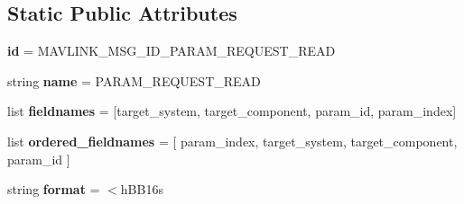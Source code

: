 \subsection*{Static Public Attributes}
\begin{DoxyCompactItemize}
\item 
\mbox{\label{classpymavlink_1_1dialects_1_1v10_1_1MAVLink__param__request__read__message_ae8f68d84282279665614cb2ad2c1c4a7}} 
{\bfseries id} = M\+A\+V\+L\+I\+N\+K\+\_\+\+M\+S\+G\+\_\+\+I\+D\+\_\+\+P\+A\+R\+A\+M\+\_\+\+R\+E\+Q\+U\+E\+S\+T\+\_\+\+R\+E\+AD
\item 
\mbox{\label{classpymavlink_1_1dialects_1_1v10_1_1MAVLink__param__request__read__message_a6ccaea0f955d96faa16d4aefde331ead}} 
string {\bfseries name} = \textquotesingle{}P\+A\+R\+A\+M\+\_\+\+R\+E\+Q\+U\+E\+S\+T\+\_\+\+R\+E\+AD\textquotesingle{}
\item 
\mbox{\label{classpymavlink_1_1dialects_1_1v10_1_1MAVLink__param__request__read__message_a5c7ed1929c10e42a3be3fe96141f7147}} 
list {\bfseries fieldnames} = \mbox{[}\textquotesingle{}target\+\_\+system\textquotesingle{}, \textquotesingle{}target\+\_\+component\textquotesingle{}, \textquotesingle{}param\+\_\+id\textquotesingle{}, \textquotesingle{}param\+\_\+index\textquotesingle{}\mbox{]}
\item 
\mbox{\label{classpymavlink_1_1dialects_1_1v10_1_1MAVLink__param__request__read__message_ab82aca844a02b6db0b9f6b3749ccbbf8}} 
list {\bfseries ordered\+\_\+fieldnames} = \mbox{[} \textquotesingle{}param\+\_\+index\textquotesingle{}, \textquotesingle{}target\+\_\+system\textquotesingle{}, \textquotesingle{}target\+\_\+component\textquotesingle{}, \textquotesingle{}param\+\_\+id\textquotesingle{} \mbox{]}
\item 
\mbox{\label{classpymavlink_1_1dialects_1_1v10_1_1MAVLink__param__request__read__message_a4abd8cfee4808baadf798984fc85d78c}} 
string {\bfseries format} = \textquotesingle{}$<$h\+B\+B16s\textquotesingle{}

\end{DoxyCompactItemize}

